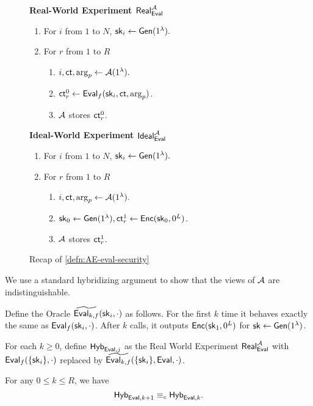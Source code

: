 \begin{figure}[ht!]
\begin{framed}
\textbf{Real-World Experiment $\mathsf{Real}^{\mathcal{A}}_{\mathsf{Eval}}$}
\begin{enumerate}
    \item For $i$ from $1$ to $N$, ${\mathsf{sk}}_i \leftarrow \mathsf{Gen}(1^{\lambda}).$
    \item For $r$ from $1$ to $R$
    \begin{enumerate}
        \item $i, \mathsf{ct}, \arg_p \leftarrow \mathcal{A}(1^{\lambda}).$
        \item $\mathsf{ct}^{0}_r \leftarrow \mathsf{Eval}_f({\mathsf{sk}}_i, \mathsf{ct}, \arg_p)$.
        \item $\mathcal{A}$ stores $\mathsf{ct}^{0}_r$.
    \end{enumerate}
\end{enumerate}
\textbf{Ideal-World Experiment $\mathsf{Ideal}^{\mathcal{A}}_{\mathsf{Eval}}$}
\begin{enumerate}
    \item For $i$ from $1$ to $N$, ${\mathsf{sk}}_i \leftarrow \mathsf{Gen}(1^{\lambda}).$
    \item For $r$ from $1$ to $R$
    \begin{enumerate}
        \item $i, \mathsf{ct}, \arg_p \leftarrow \mathcal{A}(1^{\lambda}).$
        \item ${\mathsf{sk}}_0 \leftarrow \mathsf{Gen}(1^{\lambda}), \mathsf{ct}^{1}_r \leftarrow \mathsf{Enc}({\mathsf{sk}}_0, 0^L)$.
        \item $\mathcal{A}$ stores $\mathsf{ct}^{1}_r$.
    \end{enumerate}
\end{enumerate}
\end{framed}
\caption{Recap of \cref{defn:AE-eval-security}}
\end{figure}
We use a standard hybridizing argument to show that the views of $\mathcal{A}$ are indistinguishable. 
\begin{definition}
Define the Oracle $\widetilde{\mathsf{Eval}_{k, f}}({\mathsf{sk}}_i, \cdot)$ as follows. For the first $k$ time it behaves exactly the same as $\mathsf{Eval}_f({\mathsf{sk}}_i, \cdot)$. After $k$ calls, it outputs $\mathsf{Enc}({\mathsf{sk}}_1, 0^L)$ for ${\mathsf{sk}} \leftarrow \mathsf{Gen}(1^{\lambda})$.

For each $k \geq 0$, define $\mathsf{Hyb}_{\mathsf{Eval}, j}$ as the Real World Experiment $\mathsf{Real}_{\mathsf{Eval}}^{\mathcal{A}}$ with $\mathsf{Eval}_f(\{{\mathsf{sk}}_i\}, \cdot)$ replaced by $\widetilde{\mathsf{Eval}_{k, f}}(\{{\mathsf{sk}}_i\}, \mathsf{Eval}, \cdot)$. 
\end{definition}
\begin{lemma}
    For any $0 \leq k \leq R$, we have 
    $$\mathsf{Hyb}_{\mathsf{Eval}, k + 1} \equiv_c \mathsf{Hyb}_{\mathsf{Eval}, k}.$$
\end{lemma}
